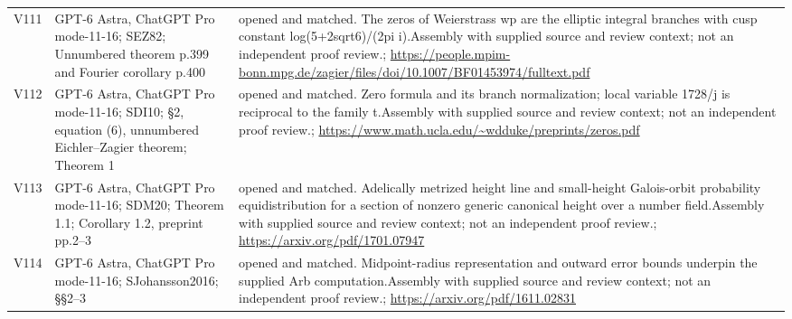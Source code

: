 \begin{longtable}{@{}L{.08\linewidth}L{.31\linewidth}L{.56\linewidth}@{}}
V111 & GPT-6 Astra, ChatGPT Pro mode-11-16; S\newline EZ82; Unnumbered theorem p.399 and Fourier corollary p.400 & opened and matched. The zeros of Weierstrass wp are the elliptic integral branches with cusp constant log(5+2sqrt6)/\allowbreak{}(2pi i).\newline Assembly with supplied source and review context; not an independent proof review.\newline {}; \url{https://people.mpim-bonn.mpg.de/zagier/files/doi/10.1007/BF01453974/fulltext.pdf}\\
V112 & GPT-6 Astra, ChatGPT Pro mode-11-16; S\newline DI10; §2, equation (6), unnumbered Eichler--Zagier theorem; Theorem 1 & opened and matched. Zero formula and its branch normalization; local variable 1728/\allowbreak{}j is reciprocal to the family t.\newline Assembly with supplied source and review context; not an independent proof review.\newline {}; \url{https://www.math.ucla.edu/~wdduke/preprints/zeros.pdf}\\
V113 & GPT-6 Astra, ChatGPT Pro mode-11-16; S\newline DM20; Theorem 1.1; Corollary 1.2, preprint pp.2--3 & opened and matched. Adelically metrized height line and small-height Galois-orbit probability equidistribution for a section of nonzero generic canonical height over a number field.\newline Assembly with supplied source and review context; not an independent proof review.\newline {}; \url{https://arxiv.org/pdf/1701.07947}\\
V114 & GPT-6 Astra, ChatGPT Pro mode-11-16; S\newline Johansson2016; §§2--3 & opened and matched. Midpoint-radius representation and outward error bounds underpin the supplied Arb computation.\newline Assembly with supplied source and review context; not an independent proof review.\newline {}; \url{https://arxiv.org/pdf/1611.02831}\\

\end{longtable}

